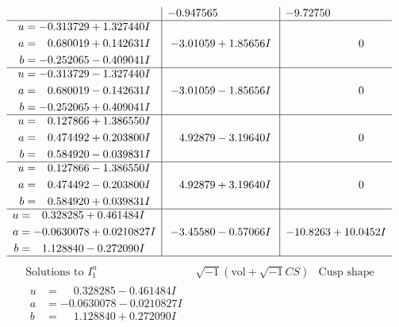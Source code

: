 \documentclass[1p]{elsarticle_modified}
\theoremstyle{definition}
\newcommand{\I}{\sqrt{-1}}
\begin{document}
$$\begin{array}{c|c|c}
 & -0.947565\phantom{ +0.000000I} & -9.72750\phantom{ +0.000000I} \\ \hline\begin{aligned}
u &= -0.313729 + 1.327440 I \\
a &= \phantom{-}0.680019 + 0.142631 I \\
b &= -0.252065 - 0.409041 I\end{aligned}
 & -3.01059 + 1.85656 I & \phantom{-0.000000 } 0 \\ \hline\begin{aligned}
u &= -0.313729 - 1.327440 I \\
a &= \phantom{-}0.680019 - 0.142631 I \\
b &= -0.252065 + 0.409041 I\end{aligned}
 & -3.01059 - 1.85656 I & \phantom{-0.000000 } 0 \\ \hline\begin{aligned}
u &= \phantom{-}0.127866 + 1.386550 I \\
a &= \phantom{-}0.474492 + 0.203800 I \\
b &= \phantom{-}0.584920 - 0.039831 I\end{aligned}
 & \phantom{-}4.92879 - 3.19640 I & \phantom{-0.000000 } 0 \\ \hline\begin{aligned}
u &= \phantom{-}0.127866 - 1.386550 I \\
a &= \phantom{-}0.474492 - 0.203800 I \\
b &= \phantom{-}0.584920 + 0.039831 I\end{aligned}
 & \phantom{-}4.92879 + 3.19640 I & \phantom{-0.000000 } 0 \\ \hline\begin{aligned}
u &= \phantom{-}0.328285 + 0.461484 I \\
a &= -0.0630078 + 0.0210827 I \\
b &= \phantom{-}1.128840 - 0.272090 I\end{aligned}
 & -3.45580 - 0.57066 I & -10.8263 + 10.0452 I\\
 \hline 
 \end{array}$$\newpage$$\begin{array}{c|c|c}  
\text{Solutions to }I^u_{1}& \I (\text{vol} + \sqrt{-1}CS) & \text{Cusp shape}\\
 \hline 
\begin{aligned}
u &= \phantom{-}0.328285 - 0.461484 I \\
a &= -0.0630078 - 0.0210827 I \\
b &= \phantom{-}1.128840 + 0.272090 I\end{aligned}

\end{array}$$
\end{document}
